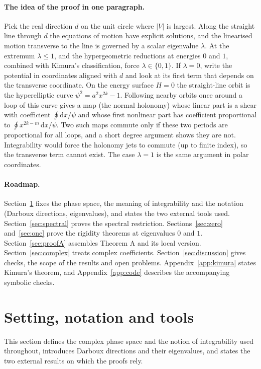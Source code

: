\documentclass[11pt]{article}
\numberwithin{equation}{section}
\theoremstyle{definition}
\theoremstyle{remark}
\newcommand{\dd}{\mathrm d}
\begin{document}
\paragraph{The idea of the proof in one paragraph.}
Pick the real direction $d$ on the unit circle where $|V|$ is largest. Along the straight line through $d$ the
equations of motion have explicit solutions, and the linearised motion transverse to the line is governed by a
scalar eigenvalue $\lambda$. At the extremum $\lambda\le1$, and the hypergeometric reductions at energies $0$ and
$1$, combined with Kimura's classification, force $\lambda\in\{0,1\}$. If $\lambda=0$, write the potential in
coordinates aligned with $d$ and look at its first term that depends on the transverse coordinate. On the energy
surface $H=0$ the straight-line orbit is the hyperelliptic curve $\psi^2=a^2x^{2k}-1$. Following nearby orbits once
around a loop of this curve gives a map (the normal holonomy) whose linear part is a shear with coefficient
$\oint \dd x/\psi$ and whose first nonlinear part has coefficient proportional to $\oint x^{2k-m}\,\dd x/\psi$.
Two such maps commute only if these two periods are proportional for all loops, and a short degree argument shows
they are not. Integrability would force the holonomy jets to commute (up to finite index), so the transverse term
cannot exist. The case $\lambda=1$ is the same argument in polar coordinates.

\paragraph{Roadmap.}
Section~\ref{sec:setting} fixes the phase space, the meaning of integrability and the notation (Darboux directions,
eigenvalues), and states the two external tools used. Section~\ref{sec:spectral} proves the spectral restriction.
Sections~\ref{sec:zero} and~\ref{sec:one} prove the rigidity theorems at eigenvalues $0$ and $1$.
Section~\ref{sec:proofA} assembles Theorem A and its local version. Section~\ref{sec:complex} treats complex
coefficients. Section~\ref{sec:discussion} gives checks, the scope of the results and open problems.
Appendix~\ref{app:kimura} states Kimura's theorem, and Appendix~\ref{app:code} describes the accompanying
symbolic checks.

\section{Setting, notation and tools}\label{sec:setting}

This section defines the complex phase space and the notion of integrability used throughout, introduces Darboux
directions and their eigenvalues, and states the two external results on which the proofs rely.
\end{document}
